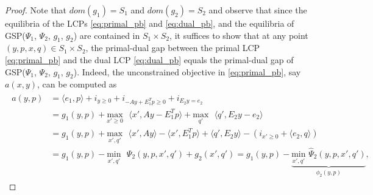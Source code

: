 \documentclass{article} %
\begin{document}
\begin{proof}
Note that $dom(g_1) = S_1$ and $dom(g_2) = S_2$ and observe that since the
equilibria of the LCPs \eqref{eq:primal_pb} and \eqref{eq:dual_pb}, and
the equilibria of GSP($\Psi_1$, $\Psi_2$, $g_1$, $g_2$) are contained
in $S_1 \times S_2$, it suffices to show that at any point $(y, p, x,
q) \in S_1 \times S_2$, the primal-dual gap between the primal
LCP \eqref{eq:primal_pb} and the dual LCP \eqref{eq:dual_pb} equals
the primal-dual gap of GSP($\Psi_1$, $\Psi_2$, $g_1$, $g_2$).
Indeed, the unconstrained objective in \eqref{eq:primal_pb}, say
$a(x,y)$, can be computed as
\begin{eqnarray*}
  \begin{aligned}
    a(y,p) &= \langle e_1,p\rangle + i_{y\ge 0} + i_{-Ay + E_1^Tp \ge 0} +
    i_{E_2y = e_2}\\
    &= g_1(y,p) + \underset{x' \geq
      0}{\text{max}}\text{ }\langle x',Ay - E_1^Tp\rangle +
    \underset{q'}{\text{max}}\text{ }\langle q',E_2y - e_2\rangle\\
    &= g_1(y,p) + \underset{x',
      q'}{\text{max}}\text{ }\langle x',Ay\rangle - \langle x',
    E_1^Tp\rangle + \langle q',E_2y\rangle -
    (i_{x' \ge 0} + \langle e_2,q\rangle)\\
    &= g_1(y,p)
      - \underset{x',q'}{\text{min}}\text{ }\Psi_2(y, p, x', q') + g_2(x',
      q') = g_1(y,p)
      - \underbrace{\underset{x',q'}{\text{min}}\text{
        }\hat{\Psi}_2(y, p, x', q')}_{\phi_2(y,p)},
  \end{aligned}
  \label{eq:a}
\end{eqnarray*}


\end{proof}
\end{document}
